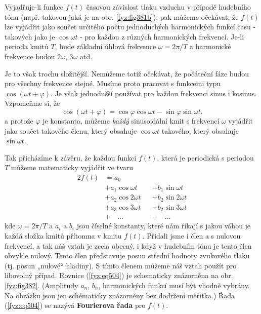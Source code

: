   Vyjadřuje-li funkce \(f(t)\) časovou závislost tlaku vzduchu v případě hudebního tónu (např. 
  takovou jaká je na obr. \ref{fyz:fig381b}), pak můžeme očekávat, že \(f(t)\) lze vyjádřit jako 
  součet určitého počtu jednoduchých harmonických funkcí času - takových jako je \(\cos\omega t\) 	
  - pro každou z různých harmonických frekvencí. Je-li perioda kmitů \(T\), bude základní úhlová 
  frekvence \(\omega = 2\pi/T\) a harmonické frekvence budou \(2\omega\), \(3\omega\) atd.

  Je to však trochu složitější. Nemůžeme totiž očekávat, že počáteční fáze budou pro všechny 
  frekvence stejné. Musíme proto pracovat s funkcemi typu \(\cos(\omega t + \varphi)\). Je však 
  jednodušší používat pro každou frekvenci sinus i kosinus. Vzpomeňme si, že
  \begin{equation}\label{fyz:eq503}
    \cos(\omega t + \varphi) = \cos\varphi\cos\omega t - \sin\varphi\sin\omega t.
  \end{equation}
   a protože \(\varphi\) je konstanta, můžeme \emph{každý} sinusoidální kmit s frekvencí \(\omega\) 
   vyjádřit jako součet takového členu, který obsahuje \(\cos\omega t\) takového, který obsahuje 
   \(\sin\omega t\).
   
   Tak přicházíme k závěru, že každou funkci \(f(t)\), která je periodická s periodou \(T\) můžeme 
   matematicky vyjádřit ve tvaru
   \begin{alignat}{2}
     f(t) &=a_0                &&                    \nonumber  \\
          &+ a_1\cos\omega t  &&+ b_1\sin\omega t   \nonumber  \\
          &+ a_2\cos2\omega t &&+ b_2\sin2\omega t  \nonumber  \\
          &+ a_3\cos3\omega t &&+ b_2\sin3\omega t  \nonumber  \\
          &+ \quad\ldots      &&+\quad\ldots        \label{fyz:eq504}
   \end{alignat}
   kde \(\omega = 2\pi/T\) a \(a_i\) a \(b_i\) jsou číselné konstanty, které nám říkají s jakou 
   váhou je každá složka kmitů přítomna v kmitu \(f(t)\). Přidali jsme i člen a s nulovou 
   frekvencí, a tak náš vztah je zcela obecný, i když v hudebním tónu je tento člen obvykle nulový. 
   Tento člen představuje posun střední hodnoty zvukového tlaku (tj. posun „nulové“ hladiny). S 
   tímto členem můžeme náš vztah použít pro libovolný případ. Rovnice (\ref{fyz:eq504}) je 
   schematicky znázorněna na obr. \ref{fyz:fig382}. (Amplitudy \(a_n\), \(b_n\), harmonických 
   funkcí musí být vhodně vybrány. Na obrázku jsou jen schématicky znázorněny bez dodržení 
   měřítka.) Řada (\ref{fyz:eq504}) se nazývá \textbf{Fourierova řada} pro \(f(t)\).
   
